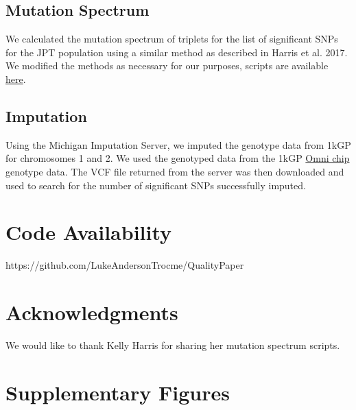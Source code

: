 \documentclass[9pt,lineno]{elife}
\begin{document}
\subsection{Mutation Spectrum}
We calculated the mutation spectrum of triplets for the list of significant SNPs for the JPT population using a similar method as described in Harris et al. 2017. \citep{Harris2017a}
We modified the methods as necessary for our purposes, scripts are available \href{https://github.com/LukeAndersonTrocme/QualityPaper}{here}. 

\subsection{Imputation}
Using the Michigan Imputation Server, we imputed the genotype data from 1kGP for chromosomes 1 and 2.
We used the genotyped data from the 1kGP \href{ftp://ftp.1000genomes.ebi.ac.uk/vol1/ftp/release/20130502/supporting/hd_genotype_chip/ALL.chip.omni_broad_sanger_combined.20140818.snps.genotypes.vcf.gz}{Omni chip} genotype data.
The VCF file returned from the server was then downloaded and used to search for the number of significant SNPs successfully imputed.

\section{Code Availability}
https://github.com/LukeAndersonTrocme/QualityPaper

\section{Acknowledgments}
We would like to thank Kelly Harris for sharing her mutation spectrum scripts.



\clearpage
\section{Supplementary Figures}

\renewcommand{\thefigure}{S\arabic{figure}}
\setcounter{figure}{0}   	
\end{document}
